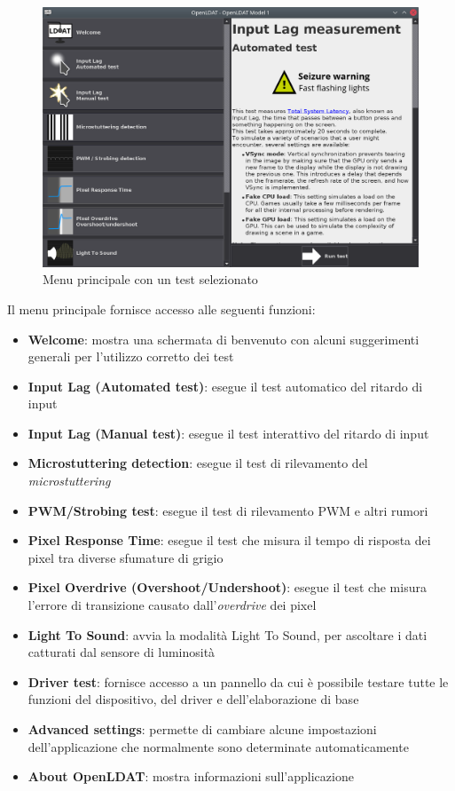 \begin{figure}[h]
	\centering
	\includegraphics[width=\textwidth]{Applicazione_files/gui_mainMenu2.png}
	\caption{Menu principale con un test selezionato}
	\label{fig:gui_mainMenu2}
\end{figure}

Il menu principale fornisce accesso alle seguenti funzioni:\begin{itemize}
	\item \textbf{Welcome}: mostra una schermata di benvenuto con alcuni suggerimenti generali per l'utilizzo corretto dei test
	\item \textbf{Input Lag (Automated test)}: esegue il test automatico del ritardo di input
	\item \textbf{Input Lag (Manual test)}: esegue il test interattivo del ritardo di input
	\item \textbf{Microstuttering detection}: esegue il test di rilevamento del \textit{microstuttering}
	\item \textbf{PWM/Strobing test}: esegue il test di rilevamento PWM e altri rumori
	\item \textbf{Pixel Response Time}: esegue il test che misura il tempo di risposta dei pixel tra diverse sfumature di grigio
	\item \textbf{Pixel Overdrive (Overshoot/Undershoot)}: esegue il test che misura l'errore di transizione causato dall'\textit{overdrive} dei pixel
	\item \textbf{Light To Sound}: avvia la modalità Light To Sound, per ascoltare i dati catturati dal sensore di luminosità
	\item \textbf{Driver test}: fornisce accesso a un pannello da cui è possibile testare tutte le funzioni del dispositivo, del driver e dell'elaborazione di base
	\item \textbf{Advanced settings}: permette di cambiare alcune impostazioni dell'applicazione che normalmente sono determinate automaticamente
	\item \textbf{About OpenLDAT}: mostra informazioni sull'applicazione
\end{itemize}

